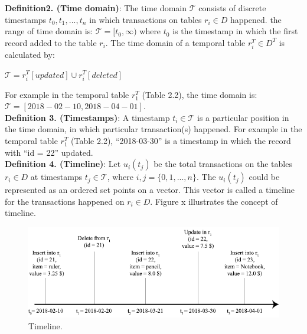 \textbf{Definition2. (Time domain)}: 
The time domain $\mathcal{T}$ consists of discrete timestamps $t_0,t_1,...,t_n$ in which transactions on tables $r_i \in D$ happened. the range of time domain is: $\mathcal{T} = [t_0, \infty)$ where $t_0$ is the timestamp in which the first record added to the table $r_i$.
The time domain of a temporal table $r_i^T \in D^T $ is calculated by:\\
\begin{center}
	$\mathcal{T} = r_i^T[updated] \cup r_i^T[deleted]$
\end{center}
For example in the temporal table $r_1^T$ (Table 2.2), the time domain is:
$\mathcal{T} = [2018-02-10,2018-04-01]$.\\

\textbf{Definition 3. (Timestamps)}: A timestamp $t_i \in \mathcal{T}$ is a particular position in the time domain, in which particular transaction(s) happened. For example in the temporal table $r_1^T$ (Table 2.2), ``2018-03-30'' is a timestamp in which the record with ``id = 22'' updated. \\

\textbf{Definition 4. (Timeline)}: Let $u_i(t_j)$ be the total transactions on the tables $r_i \in D$ at timestamps $t_j \in \mathcal{T}$, where $i,j=\{0,1,...,n\}$. The $u_i(t_j)$ could be represented as an ordered set points on a vector. This vector is called a timeline for the transactions happened on $r_i \in D$. Figure x illustrates the concept of timeline.\\
\begin{figure}[H]
	\label{fig:timeline}
	\centering
	\includegraphics[width=\textwidth]{figs/timeline.pdf}
	\caption{Timeline.}
\end{figure}

